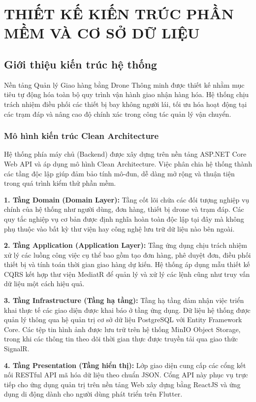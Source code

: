 ﻿\chapter{THIẾT KẾ KIẾN TRÚC PHẦN MỀM VÀ CƠ SỞ DỮ LIỆU}

\section{Giới thiệu kiến trúc hệ thống}
Nền tảng Quản lý Giao hàng bằng Drone Thông minh được thiết kế nhằm mục tiêu tự động hóa toàn bộ quy trình vận hành giao nhận hàng hóa. Hệ thống chịu trách nhiệm điều phối các thiết bị bay không người lái, tối ưu hóa hoạt động tại các trạm đáp và nâng cao độ chính xác trong công tác quản lý vận chuyển.

\subsection{Mô hình kiến trúc Clean Architecture}
Hệ thống phía máy chủ (Backend) được xây dựng trên nền tảng ASP.NET Core Web API và áp dụng mô hình Clean Architecture. Việc phân chia hệ thống thành các tầng độc lập giúp đảm bảo tính mô-đun, dễ dàng mở rộng và thuận tiện trong quá trình kiểm thử phần mềm.

\noindent\textbf{1. Tầng Domain (Domain Layer):} Tầng cốt lõi chứa các đối tượng nghiệp vụ chính của hệ thống như người dùng, đơn hàng, thiết bị drone và trạm đáp. Các quy tắc nghiệp vụ cơ bản được định nghĩa hoàn toàn độc lập tại đây mà không phụ thuộc vào bất kỳ thư viện hay công nghệ lưu trữ dữ liệu nào bên ngoài.

\noindent\textbf{2. Tầng Application (Application Layer):} Tầng ứng dụng chịu trách nhiệm xử lý các luồng công việc cụ thể bao gồm tạo đơn hàng, phê duyệt đơn, điều phối thiết bị và tính toán thời gian giao hàng dự kiến. Hệ thống áp dụng mẫu thiết kế CQRS kết hợp thư viện MediatR để quản lý và xử lý các lệnh cũng như truy vấn dữ liệu một cách hiệu quả.

\noindent\textbf{3. Tầng Infrastructure (Tầng hạ tầng):} Tầng hạ tầng đảm nhận việc triển khai thực tế các giao diện được khai báo ở tầng ứng dụng. Dữ liệu hệ thống được quản lý thông qua hệ quản trị cơ sở dữ liệu PostgreSQL với Entity Framework Core. Các tệp tin hình ảnh được lưu trữ trên hệ thống MinIO Object Storage, trong khi các thông tin theo dõi thời gian thực được truyền tải qua giao thức SignalR.

\noindent\textbf{4. Tầng Presentation (Tầng hiển thị):} Lớp giao diện cung cấp các cổng kết nối RESTful API mã hóa dữ liệu theo chuẩn JSON. Cổng API này phục vụ trực tiếp cho ứng dụng quản trị trên nền tảng Web xây dựng bằng ReactJS và ứng dụng di động dành cho người dùng phát triển trên Flutter.


